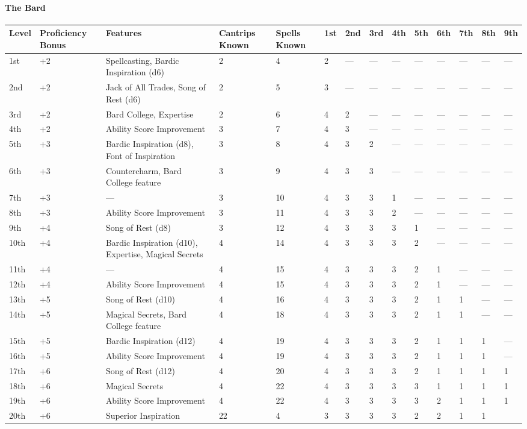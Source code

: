 \hypertarget{the-bard}{%
\paragraph{The Bard}\label{the-bard}}

\begin{longtable}[]{@{}llllllllllllll@{}}
\toprule
Level & Proficiency Bonus & Features & Cantrips Known & Spells Known &
1st & 2nd & 3rd & 4th & 5th & 6th & 7th & 8th & 9th\tabularnewline
\midrule
\endhead
1st & +2 & Spellcasting, Bardic Inspiration (d6) & 2 & 4 & 2 & --- & ---
& --- & --- & --- & --- & --- & ---\tabularnewline
2nd & +2 & Jack of All Trades, Song of Rest (d6) & 2 & 5 & 3 & --- & ---
& --- & --- & --- & --- & --- & ---\tabularnewline
3rd & +2 & Bard College, Expertise & 2 & 6 & 4 & 2 & --- & --- & --- &
--- & --- & --- & ---\tabularnewline
4th & +2 & Ability Score Improvement & 3 & 7 & 4 & 3 & --- & --- & --- &
--- & --- & --- & ---\tabularnewline
5th & +3 & Bardic Inspiration (d8), Font of Inspiration & 3 & 8 & 4 & 3
& 2 & --- & --- & --- & --- & --- & ---\tabularnewline
6th & +3 & Countercharm, Bard College feature & 3 & 9 & 4 & 3 & 3 & ---
& --- & --- & --- & --- & ---\tabularnewline
7th & +3 & --- & 3 & 10 & 4 & 3 & 3 & 1 & --- & --- & --- & --- &
---\tabularnewline
8th & +3 & Ability Score Improvement & 3 & 11 & 4 & 3 & 3 & 2 & --- &
--- & --- & --- & ---\tabularnewline
9th & +4 & Song of Rest (d8) & 3 & 12 & 4 & 3 & 3 & 3 & 1 & --- & --- &
--- & ---\tabularnewline
10th & +4 & Bardic Inspiration (d10), Expertise, Magical Secrets & 4 &
14 & 4 & 3 & 3 & 3 & 2 & --- & --- & --- & ---\tabularnewline
11th & +4 & --- & 4 & 15 & 4 & 3 & 3 & 3 & 2 & 1 & --- & --- &
---\tabularnewline
12th & +4 & Ability Score Improvement & 4 & 15 & 4 & 3 & 3 & 3 & 2 & 1 &
--- & --- & ---\tabularnewline
13th & +5 & Song of Rest (d10) & 4 & 16 & 4 & 3 & 3 & 3 & 2 & 1 & 1 &
--- & ---\tabularnewline
14th & +5 & Magical Secrets, Bard College feature & 4 & 18 & 4 & 3 & 3 &
3 & 2 & 1 & 1 & --- & ---\tabularnewline
15th & +5 & Bardic Inspiration (d12) & 4 & 19 & 4 & 3 & 3 & 3 & 2 & 1 &
1 & 1 & ---\tabularnewline
16th & +5 & Ability Score Improvement & 4 & 19 & 4 & 3 & 3 & 3 & 2 & 1 &
1 & 1 & ---\tabularnewline
17th & +6 & Song of Rest (d12) & 4 & 20 & 4 & 3 & 3 & 3 & 2 & 1 & 1 & 1
& 1\tabularnewline
18th & +6 & Magical Secrets & 4 & 22 & 4 & 3 & 3 & 3 & 3 & 1 & 1 & 1 &
1\tabularnewline
19th & +6 & Ability Score Improvement & 4 & 22 & 4 & 3 & 3 & 3 & 3 & 2 &
1 & 1 & 1\tabularnewline
20th & +6 & Superior Inspiration & 22 & 4 & 3 & 3 & 3 & 3 & 2 & 2 & 1 &
1 &\tabularnewline
\bottomrule
\end{longtable}

